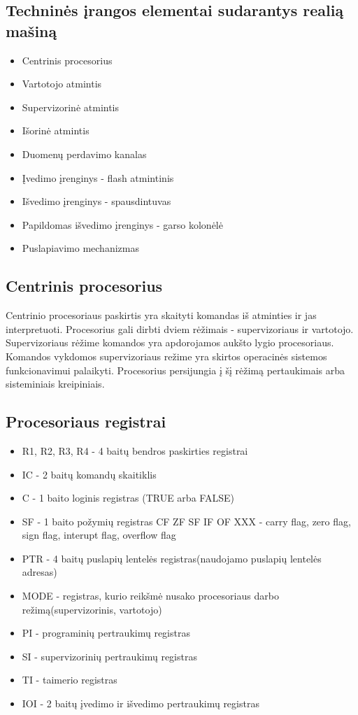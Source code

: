 \documentclass[oneside]{VUMIFPSkursinis}
\begin{document}
\subsection{Techninės įrangos elementai sudarantys realią mašiną}
\begin{itemize}
	\item{Centrinis procesorius}
	\item{Vartotojo atmintis}
	\item{Supervizorinė atmintis}
	\item{Išorinė atmintis}
	\item{Duomenų perdavimo kanalas}
	\item{Įvedimo įrenginys - flash atmintinis}
	\item{Išvedimo įrenginys - spausdintuvas}
	\item{Papildomas išvedimo įrenginys - garso kolonėlė}
	\item{Puslapiavimo mechanizmas}
\end{itemize}

\subsection{Centrinis procesorius}
	Centrinio procesoriaus paskirtis yra skaityti komandas iš atminties ir jas interpretuoti. Procesorius gali dirbti dviem rėžimais - supervizoriaus ir vartotojo. Supervizoriaus rėžime komandos yra apdorojamos aukšto lygio procesoriaus. Komandos vykdomos supervizoriaus režime yra skirtos operacinės sistemos funkcionavimui palaikyti. Procesorius persijungia į šį rėžimą pertaukimais arba sisteminiais kreipiniais.
\subsection{Procesoriaus registrai}
\begin{itemize}
	\item{R1, R2, R3, R4 - 4 baitų bendros paskirties registrai}  
	\item{IC - 2 baitų komandų skaitiklis}
	\item{C - 1 baito loginis registras (TRUE arba FALSE)}
	\item{SF - 1 baito požymių registras CF ZF SF IF OF XXX - carry flag, zero flag, sign flag, interupt flag, overflow flag}
	\item{PTR - 4 baitų puslapių lentelės registras(naudojamo puslapių lentelės adresas)}
	\item{MODE - registras, kurio reikšmė nusako procesoriaus darbo režimą(supervizorinis, vartotojo)}
	\item{PI - programinių pertraukimų registras}
	\item{SI - supervizorinių pertraukimų registras}
	\item{TI - taimerio registras}
	\item{IOI - 2 baitų įvedimo ir išvedimo pertraukimų registras}
\end{itemize}
\end{document}
